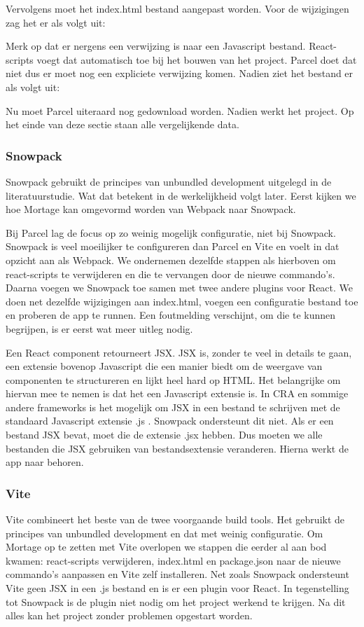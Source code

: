Vervolgens moet het index.html bestand aangepast worden. Voor de wijzigingen zag het er als volgt uit:

Merk op dat er nergens een verwijzing is naar een Javascript bestand. React-scripts voegt dat automatisch toe bij het bouwen van het project. Parcel doet dat niet dus er moet nog een expliciete verwijzing komen. Nadien ziet het bestand er als volgt uit:

Nu moet Parcel uiteraard nog gedownload worden. Nadien werkt het project. Op het einde van deze sectie staan alle vergelijkende data.

\subsubsection{Snowpack}
Snowpack gebruikt de principes van unbundled development uitgelegd in de literatuurstudie. Wat dat betekent in de werkelijkheid volgt later. Eerst kijken we hoe Mortage kan omgevormd worden van Webpack naar Snowpack. 

Bij Parcel lag de focus op zo weinig mogelijk configuratie, niet bij Snowpack. Snowpack is veel moeilijker te configureren dan Parcel en Vite en voelt in dat opzicht aan als Webpack. We ondernemen dezelfde stappen als hierboven om react-scripts te verwijderen en die te vervangen door de nieuwe commando’s. Daarna voegen we Snowpack toe samen met twee andere plugins voor React. We doen net dezelfde wijzigingen aan index.html, voegen een configuratie bestand toe en proberen de app te runnen. Een foutmelding verschijnt, om die te kunnen begrijpen, is er eerst wat meer uitleg nodig.

Een React component retourneert JSX. JSX is, zonder te veel in details te gaan, een extensie bovenop Javascript die een manier biedt om de weergave van componenten te structureren en lijkt heel hard op HTML. Het belangrijke om hiervan mee te nemen is dat het een Javascript extensie is. In CRA en sommige andere frameworks is het mogelijk om JSX in een bestand te schrijven met de standaard Javascript extensie .js . Snowpack ondersteunt dit niet. Als er een bestand JSX bevat, moet die de extensie .jsx hebben. Dus moeten we alle bestanden die JSX gebruiken van bestandsextensie veranderen. Hierna werkt de app naar behoren. 

\subsubsection{Vite}
Vite combineert het beste van de twee voorgaande build tools. Het gebruikt de principes van unbundled development en dat met weinig configuratie. Om Mortage op te zetten met Vite overlopen we stappen die eerder al aan bod kwamen: react-scripts verwijderen, index.html en package.json naar de nieuwe commando’s aanpassen en Vite zelf installeren. Net zoals Snowpack ondersteunt Vite geen JSX in een .js bestand en is er een plugin voor React. In tegenstelling tot Snowpack is de plugin niet nodig om het project werkend te krijgen. Na dit alles kan het project zonder problemen opgestart worden. 

